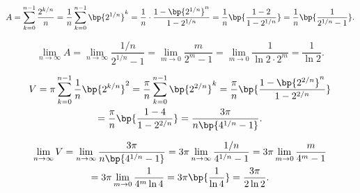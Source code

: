 \begin{solution}
    \begin{ppart}
        \[A = \sum_{k=0}^{n-1} \frac{2^{k/n}}n = \frac1n \sum_{k=0}^{n-1} \bp{2^{1/n}}^k = \frac1n \cdot \frac{1 - \bp{2^{1/n}}^{n}}{1 - 2^{1/n}} = \frac1n \bp{\frac{1 -2}{1 - 2^{1/n}}} = \frac1n \bp{\frac{1}{2^{1/n} - 1}}.\]
    \end{ppart}
    \begin{ppart}
        \[\lim_{n \to \infty} A = \lim_{n \to \infty} \frac{1/n}{2^{1/n} - 1} = \lim_{m \to 0} \frac{m}{2^m - 1} = \lim_{m \to 0} \frac{1}{\ln 2 \cdot 2^m} = \frac1{\ln 2}.\]
    \end{ppart}
    \begin{ppart}
        \begin{gather*}
            V = \pi \sum_{k=0}^{n-1} \frac1n \bp{2^{k/n}}^2 = \frac\pi{n} \sum_{k=0}^{n-1} \bp{2^{2/n}}^k = \frac\pi{n} \bp{\frac{1 - \bp{2^{2/n}}^{n}}{1 - 2^{2/n}}}\\
            = \frac\pi{n} \bp{\frac{1 - 4}{1 - 2^{2/n}}} = \frac{3\pi}{n\bp{4^{1/n} - 1}}.
        \end{gather*}
    \end{ppart}
    \begin{ppart}
        \begin{gather*}
            \lim_{n \to \infty} V = \lim_{n \to \infty} \frac{3\pi}{n\bp{4^{1/n} - 1}} = 3\pi \lim_{n \to \infty} \frac{1/n}{4^{1/n} - 1} = 3\pi \lim_{m \to 0} \frac{m}{4^m - 1} \\
            = 3\pi \lim_{m \to 0} \frac{1}{4^m \ln 4} = 3\pi \bp{\frac1{\ln 4}} = \frac{3\pi}{2\ln2}.
        \end{gather*}
    \end{ppart}
\end{solution}

